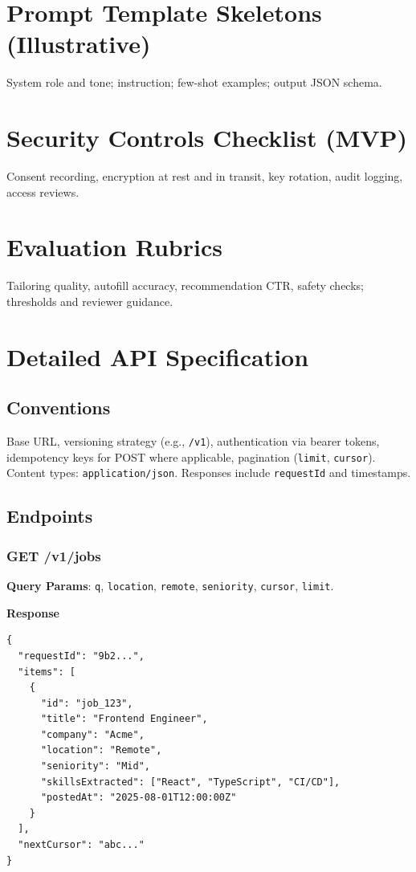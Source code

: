 \documentclass[12pt,a4paper]{article}
\begin{document}
\section{Prompt Template Skeletons (Illustrative)}
System role and tone; instruction; few-shot examples; output JSON schema.

\section{Security Controls Checklist (MVP)}
Consent recording, encryption at rest and in transit, key rotation, audit logging, access reviews.

\section{Evaluation Rubrics}
Tailoring quality, autofill accuracy, recommendation CTR, safety checks; thresholds and reviewer guidance.

\section{Detailed API Specification}
\subsection{Conventions}
Base URL, versioning strategy (e.g., \texttt{/v1}), authentication via bearer tokens, idempotency keys for POST where applicable, pagination (\texttt{limit}, \texttt{cursor}). Content types: \texttt{application/json}. Responses include \texttt{requestId} and timestamps.
\subsection{Endpoints}
\subsubsection{GET /v1/jobs}
\textbf{Query Params}: \texttt{q}, \texttt{location}, \texttt{remote}, \texttt{seniority}, \texttt{cursor}, \texttt{limit}.
\par\noindent\textbf{Response}
\begin{lstlisting}[style=code]
{
  "requestId": "9b2...",
  "items": [
    {
      "id": "job_123",
      "title": "Frontend Engineer",
      "company": "Acme",
      "location": "Remote",
      "seniority": "Mid",
      "skillsExtracted": ["React", "TypeScript", "CI/CD"],
      "postedAt": "2025-08-01T12:00:00Z"
    }
  ],
  "nextCursor": "abc..."
}
\end{lstlisting}
\end{document}
